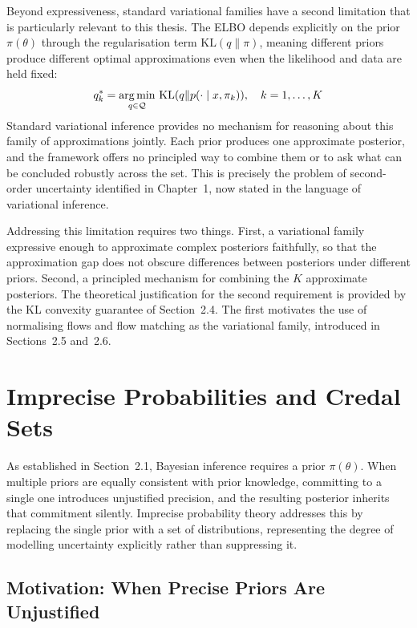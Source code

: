     Beyond expressiveness, standard variational families have a second limitation that is particularly relevant to this thesis. The ELBO depends explicitly on the prior $\pi(\theta)$ through the regularisation term $\mathrm{KL}(q \| \pi)$, meaning different priors produce different optimal approximations even when the likelihood and data are held fixed:
    \begin{equation}
        q^*_k = \operatorname*{arg\,min}_{q \in \mathcal{Q}}\, \mathrm{KL}(q \| p(\cdot \mid x, \pi_k)), \quad k = 1, \ldots, K
    \end{equation}
    Standard variational inference provides no mechanism for reasoning about this family of approximations jointly. Each prior produces one approximate posterior, and the framework offers no principled way to combine them or to ask what can be concluded robustly across the set. This is precisely the problem of second-order uncertainty identified in Chapter~1, now stated in the language of variational inference.

    Addressing this limitation requires two things. First, a variational family expressive enough to approximate complex posteriors faithfully, so that the approximation gap does not obscure differences between posteriors under different priors. Second, a principled mechanism for combining the $K$ approximate posteriors. The theoretical justification for the second requirement is provided by the KL convexity guarantee of Section~2.4. The first motivates the use of normalising flows and flow matching as the variational family, introduced in Sections~2.5 and~2.6.

\section{Imprecise Probabilities and Credal Sets}
As established in Section~2.1, Bayesian inference requires a prior $\pi(\theta)$. When multiple priors are equally consistent with prior knowledge, committing to a single one introduces unjustified precision, and the resulting posterior inherits that commitment silently. Imprecise probability theory addresses this by replacing the single prior with a set of distributions, representing the degree of modelling uncertainty explicitly rather than suppressing it.

    \subsection{Motivation: When Precise Priors Are Unjustified}

